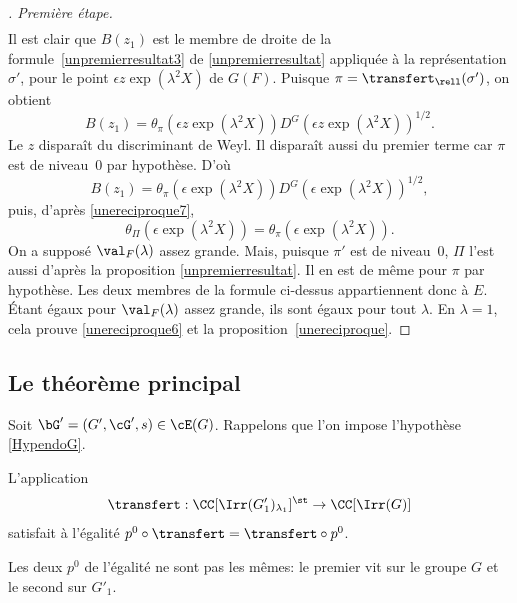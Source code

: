 \begin{proof}[\proofname. Première étape]
\begin{multline*}
\end{multline*}
Il est clair que $B(z_{1})$ est le membre de droite de la formule~\eqref{unpremierresultat3} de \ref{unpremierresultat} appliquée à la représentation $\sigma'$, pour le point $\epsilon z \exp(\lambda^2X)$ de $G(F)$. Puisque $\pi=\transfert_{\rell}(\sigma')$, on obtient
\[
B(z_{1})=\theta_{\pi}(\epsilon z \exp(\lambda^2X))D^G(\epsilon z \exp(\lambda^2X))^{1/2}.
\]
Le $z$ disparaît du discriminant de Weyl. Il disparaît aussi du premier terme car $\pi$ est de niveau~$0$ par hypothèse. D'où
\[
B(z_{1})=\theta_{\pi}(\epsilon \exp(\lambda^2X))D^G(\epsilon \exp(\lambda^2X))^{1/2},
\]
puis, d'après \eqref{unereciproque7},
\[
\theta_{\Pi}( \epsilon \exp(\lambda^2X)) =\theta_{\pi}( \epsilon \exp(\lambda^2X)).
\]
On a supposé $\val_{F}(\lambda)$ assez grande. Mais, puisque $\pi'$ est de niveau~$0$, $\Pi$ l'est aussi d'après la proposition \ref{unpremierresultat}. Il en est de même pour $\pi$ par hypothèse. Les deux membres de la formule ci-dessus appartiennent donc à $E$. Étant égaux pour $\val_{F}(\lambda)$ assez grande, ils sont égaux pour tout $\lambda$. En $\lambda=1$, cela prouve \eqref{unereciproque6} et la proposition~\ref{unereciproque}.
\end{proof}

\subsection{Le théorème principal}\label{letheoreme}

Soit $\bG'=(G',\cG',s)\in \cE(G)$. Rappelons que l'on impose l'hypothèse \ref{HypendoG}.
\begin{thm*}
L'application
\[
\transfert:\CC[\Irr(G'_{1})_{\lambda_{1}}]^{\st}\to \CC[\Irr(G)]
\]
satisfait à l'égalité $p^0\circ \transfert=\transfert\circ p^0$.
\end{thm*}

\begin{rem*}
Les deux $p^0$ de l'égalité ne sont pas les mêmes: le premier vit sur le groupe $G$ et le second sur $G'_{1}$.
\end{rem*}

